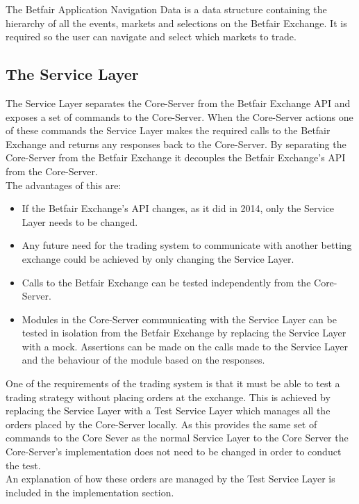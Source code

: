 	The Betfair Application Navigation Data is a data structure containing the hierarchy of all the events, markets and selections on the Betfair Exchange. It is required so the user can navigate and select which markets to trade.
			
\subsection{The Service Layer}
The Service Layer separates the Core-Server from the Betfair Exchange API and exposes a set of commands to the Core-Server. When the Core-Server actions one of these commands the Service Layer makes the required calls to the Betfair Exchange and returns any responses back to the Core-Server. By separating the Core-Server from the Betfair Exchange it decouples the Betfair Exchange's API from the Core-Server.\\

The advantages of this are:
	\begin{itemize}
		\item If the Betfair Exchange's API changes, as it did in 2014\cite{BetfairAPIMigration}, only the Service Layer needs to be changed.
		\item Any future need for the trading system to communicate with another betting exchange could be achieved by only changing the Service Layer.
		\item Calls to the Betfair Exchange can be tested independently from the Core-Server.
		\item Modules in the Core-Server communicating with the Service Layer can be tested in isolation from the Betfair Exchange by replacing the Service Layer with a mock. Assertions can be made on the calls made to the Service Layer and the behaviour of the module based on the responses.
	\end{itemize}

One of the requirements of the trading system is that it must be able to test a trading strategy without placing orders at the exchange. This is achieved by replacing the Service Layer with a Test Service Layer which manages all the orders placed by the Core-Server locally. As this provides the same set of commands to the Core Sever as the normal Service Layer to the Core Server the Core-Server's implementation does not need to be changed in order to conduct the test.\\

An explanation of how these orders are managed by the Test Service Layer is included in the implementation section.
